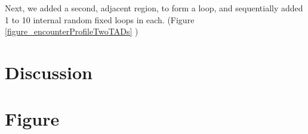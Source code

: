 \documentclass[12pt]{article}
\begin{document}
Next, we added a second, adjacent region, to form a loop, and sequentially added 1 to 10 internal random fixed loops in each. (Figure \ref{figure_encounterProfileTwoTADs} ) %




\section{Discussion}\label{section_discussion}

\section{Figure}\label{section_figures}
\end{document}
